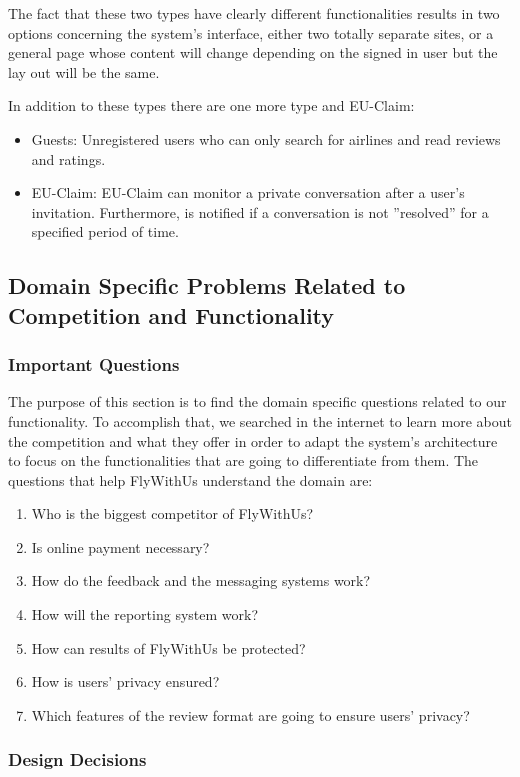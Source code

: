 \documentclass{article}
\begin{document}
The fact that these two types have clearly different functionalities results in two options concerning the system's interface, either two totally separate sites, or a general page 
whose content will change depending on the signed in user but the lay out will be the same.

In addition to these types there are one more type and EU-Claim:
\begin{itemize}
 \item Guests: Unregistered users who can only search for airlines and read reviews and ratings.
 \item EU-Claim: EU-Claim can monitor a private conversation after a user's invitation. Furthermore, is notified if a conversation is not ''resolved'' for a specified period of time.
\end{itemize}


\subsection{Domain Specific Problems Related to Competition and Functionality}
\subsubsection{Important Questions}
The purpose of this section is to find the domain specific questions related to our functionality. To accomplish that, we searched in the internet to learn more about the competition
and what they offer in order to adapt the system's architecture to focus on the functionalities that are going to differentiate from them. The questions that help FlyWithUs understand the 
domain are:
\begin{enumerate}
\item Who is the biggest competitor of FlyWithUs?
\item Is online payment necessary?
\item How do the feedback and the messaging systems work?
\item How will the reporting system work?
\item How can results of FlyWithUs be protected?
\item How is users' privacy ensured?
\item Which features of the review format are going to ensure users' privacy?
\end{enumerate}

\subsubsection{Design Decisions}
\end{document}
